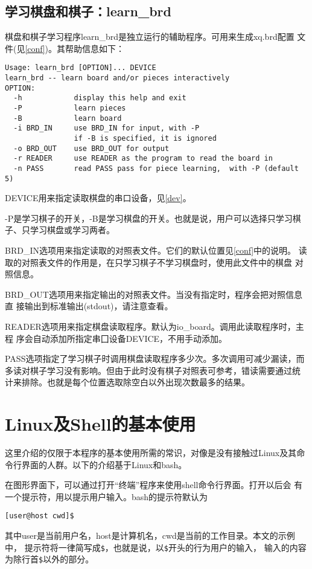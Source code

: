 \documentclass[a4paper]{article}
\begin{document}
\subsection{学习棋盘和棋子：learn\_brd}
棋盘和棋子学习程序learn\_brd是独立运行的辅助程序。可用来生成xq.brd配置
文件(见\ref{conf})。其帮助信息如下：
\begin{verbatim}
Usage: learn_brd [OPTION]... DEVICE
learn_brd -- learn board and/or pieces interactively
OPTION:
  -h            display this help and exit
  -P            learn pieces
  -B            learn board
  -i BRD_IN     use BRD_IN for input, with -P
                if -B is specified, it is ignored
  -o BRD_OUT    use BRD_OUT for output
  -r READER     use READER as the program to read the board in
  -n PASS       read PASS pass for piece learning,  with -P (default 5)
\end{verbatim}

DEVICE用来指定读取棋盘的串口设备，见\ref{dev}。

-P是学习棋子的开关，-B是学习棋盘的开关。也就是说，用户可以选择只学习棋
子、只学习棋盘或学习两者。

BRD\_IN选项用来指定读取的对照表文件。它们的默认位置见\ref{conf}中的说明。
读取的对照表文件的作用是，在只学习棋子不学习棋盘时，使用此文件中的棋盘
对照信息。

BRD\_OUT选项用来指定输出的对照表文件。当没有指定时，程序会把对照信息直
接输出到标准输出(stdout)，请注意查看。

READER选项用来指定棋盘读取程序。默认为io\_board。调用此读取程序时，主程
序会自动添加所指定串囗设备DEVICE，不用手动添加。

PASS选项指定了学习棋子时调用棋盘读取程序多少次。多次调用可减少漏读，而
多读对棋子学习没有影响。但由于此时没有棋子对照表可参考，错读需要通过统
计来排除。也就是每个位置选取除空白以外出现次数最多的结果。

\clearpage
\appendix
\section{Linux及Shell的基本使用}
\label{app1}

这里介绍的仅限于本程序的基本使用所需的常识，对像是没有接触过Linux及其命
令行界面的人群。以下的介绍基于Linux和bash。

在图形界面下，可以通过打开``终端''程序来使用shell命令行界面。打开以后会
有一个提示符，用以提示用户输入。bash的提示符默认为
\begin{verbatim}
[user@host cwd]$ 
\end{verbatim}
其中user是当前用户名，host是计算机名，cwd是当前的工作目录。本文的示例中，
提示符将一律简写成\verb|$|，也就是说，以\verb|$|开头的行为用户的输入，
输入的内容为除行首\verb|$|以外的部分。
\end{document}
